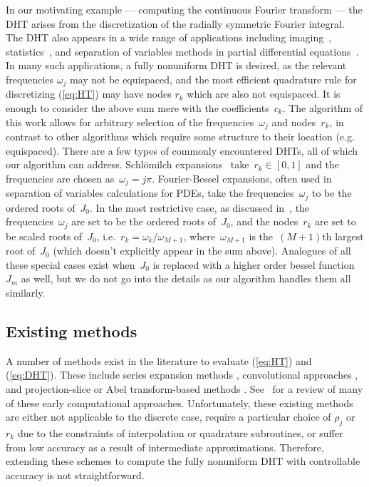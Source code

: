 In our motivating example --- computing the continuous Fourier transform --- the
DHT arises from the discretization of the radially symmetric Fourier integral.
The DHT also appears in a wide range of applications including
imaging~\cite{higgins1988hankel, zhao2013fourier}, statistics~\cite{lord1954a,
genton2002nonparametric}, and separation of variables methods in partial
differential equations~\cite{bisseling1985fast,ali1999generalized}. In many such
applications, a fully nonuniform DHT is desired, as the relevant frequencies
$\omega_j$ may not be equispaced, and the most efficient quadrature rule for
discretizing (\ref{eq:HT}) may have nodes $r_k$ which are also not equispaced.
It is enough to consider the above sum mere with the coefficients~$c_k$. The
algorithm of this work allows for arbitrary selection of the
frequencies~$\omega_j$ and nodes~$r_k$, in contrast to other algorithms which
require some structure to their location (e.g. equispaced). There are a few
types of commonly encountered DHTs, all of which our algorithm can address.
Schl\"omilch expansions~\cite{} take~$r_k \in [0,1]$ and the frequencies are
chosen as~$\omega_j = j\pi$. Fourier-Bessel expansions, often used in separation
of variables calculations for PDEs, take the frequencies~$\omega_j$ to be the
ordered roots of~$J_0$. In the most restrictive case, as discussed
in~\cite{johnson1987}, the frequencies~$\omega_j$ are set to be the ordered
roots of~$J_0$, and the nodes~$r_k$ are set to be scaled roots of~$J_0$,
i.e.~$r_k = \omega_k/\omega_{M+1}$, where~$\omega_{M+1}$ is the~$(M+1)$th
largest root of~$J_0$ (which doesn't explicitly appear in the sum above).
Analogues of all these special cases exist when~$J_0$ is replaced with a higher
order bessel function~$J_m$ as well, but we do not go into the details as our
algorithm handles them all similarly.

\subsection*{Existing methods}
\label{sec:existing}

A number of methods exist in the literature to evaluate (\ref{eq:HT}) and
(\ref{eq:DHT}). These include series expansion methods
\cite{lord1954b,brunol1977fourier,cavanagh1979numerical}, convolutional
approaches \cite{siegman1977quasi, johansen1979fast, mook1983algorithm,
liu1999nonuniform}, and projection-slice or Abel transform-based methods
\cite{oppenheim1980computation, hansen1985fast, kapur1995algorithm}.
See~\cite{cree1993algorithms} for a review of many of these early computational
approaches. Unfortunately, these existing methods are either not applicable to
the discrete case, require a particular choice of $\rho_j$ or $r_k$ due to the
constraints of interpolation or quadrature subroutines, or suffer from low
accuracy as a result of intermediate approximations. Therefore, extending these
schemes to compute the fully nonuniform DHT with controllable accuracy is not
straightforward.

